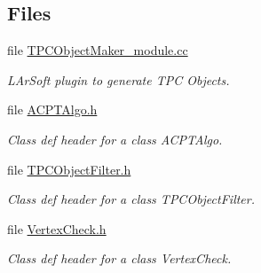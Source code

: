 \subsection*{\-Files}
\begin{DoxyCompactItemize}
\item 
file \hyperlink{TPCObjectMaker__module_8cc}{\-T\-P\-C\-Object\-Maker\-\_\-module.\-cc}
\begin{DoxyCompactList}\small\item\em \-L\-Ar\-Soft plugin to generate \-T\-P\-C \-Objects. \end{DoxyCompactList}\item 
file \hyperlink{ACPTAlgo_8h}{\-A\-C\-P\-T\-Algo.\-h}
\begin{DoxyCompactList}\small\item\em \-Class def header for a class \-A\-C\-P\-T\-Algo. \end{DoxyCompactList}\item 
file \hyperlink{TPCObjectFilter_8h}{\-T\-P\-C\-Object\-Filter.\-h}
\begin{DoxyCompactList}\small\item\em \-Class def header for a class \-T\-P\-C\-Object\-Filter. \end{DoxyCompactList}\item 
file \hyperlink{VertexCheck_8h}{\-Vertex\-Check.\-h}
\begin{DoxyCompactList}\small\item\em \-Class def header for a class \-Vertex\-Check. \end{DoxyCompactList}\end{DoxyCompactItemize}
